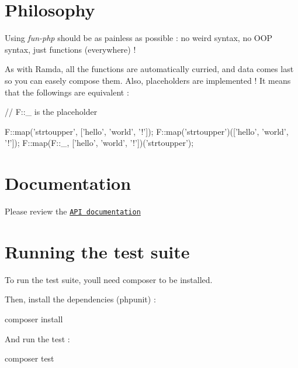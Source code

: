 \section*{Philosophy}

Using {\itshape fun-\/php} should be as painless as possible \+: no weird syntax, no O\+OP syntax, just functions (everywhere) !

As with Ramda, all the functions are automatically curried, and data comes last so you can easely compose them. Also, placeholders are implemented ! It means that the followings are equivalent \+:


\begin{DoxyCode}
\textcolor{comment}{// F::\_ is the placeholder}

F::map(\textcolor{stringliteral}{'strtoupper'}, [\textcolor{stringliteral}{'hello'}, \textcolor{stringliteral}{'world'}, \textcolor{charliteral}{'!'}]);
F::map(\textcolor{stringliteral}{'strtoupper'})([\textcolor{stringliteral}{'hello'}, \textcolor{stringliteral}{'world'}, \textcolor{charliteral}{'!'}]);
F::map(F::\_, [\textcolor{stringliteral}{'hello'}, \textcolor{stringliteral}{'world'}, \textcolor{charliteral}{'!'}])(\textcolor{stringliteral}{'strtoupper'});
\end{DoxyCode}


\section*{Documentation}

Please review the \href{/fun-php/classboehm__s_1_1F.html#a1712c41e5be41e6f6e2088ed5d54a864}{\tt A\+PI documentation}

\section*{Running the test suite}

To run the test suite, you\textquotesingle{}ll need {\ttfamily composer} to be installed.

Then, install the dependencies (phpunit) \+:


\begin{DoxyCode}
composer install
\end{DoxyCode}


And run the test \+:


\begin{DoxyCode}
composer test
\end{DoxyCode}
 